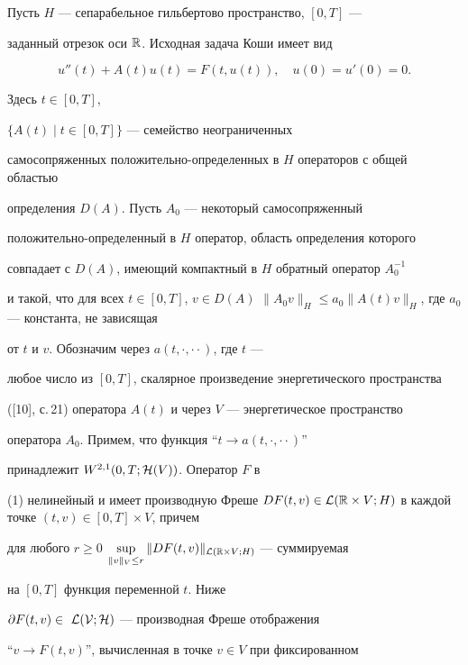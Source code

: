 Пусть $H$ --- сепарабельное гильбертово пространство, $[0,T]$ ---


заданный отрезок оси ${\Bbb R}$.  Исходная задача Коши имеет вид


\begin{equation}


u''(t)


+ A(t)u(t) = F(t,u(t)),\quad u(0)=u'(0)=0.


\end{equation}


Здесь $t\in[0,T]$,


$\{A(t)\mid t\in[0,T]\}$ --- семейство неограниченных


самосопряженных положительно-определенных в $H$ операторов с общей областью


определения $D(A)$.  Пусть $A_0$ --- некоторый самосопряженный


положительно-определенный в $H$ оператор, область определения которого


совпадает с $D(A)$, имеющий компактный в $H$ обратный оператор $A^{-1}_{0}$


и такой, что для всех $t\in[0,T]$, $v\in D(A)$\; $\|A_{0}v\|_{H}


\leq a_0 \|A(t)v \|_{H}$, где $a_0$ --- константа, не зависящая


от $t$ и $v$.  Обозначим через $a(t,\cdot,\cdot\cdot)$, где $t$ ---


любое число из $[0,T]$, скалярное произведение энергетического пространства


([10], с.\,21) оператора $A(t)$ и через $V$ --- энергетическое пространство


оператора $A_0$.  Примем, что функция ``$t\to a(t,\cdot,\cdot\cdot)$''


принадлежит $W^{2,1}(0,T;{\cal H}(V))$.  Оператор $F$ в


(1) нелинейный и имеет производную Фреше $DF(t,v)\in{\cal


L}({\Bbb R}\times V;H)$ в каждой точке $(t,v) \in[0,T]\times V$, причем


для любого $r\ge 0$\; $\sup\limits_{\|v\|_{V} \leq r} \|DF(t,v)


\|_{{\cal L}({\Bbb R}\times V;H)}$ --- суммируемая


на $[0,T]$ функция переменной $t$.  Ниже


$\partial F(t,v)\in\ \cal {L}(V;H)$ --- производная Фреше отображения


``$v\to F(t,v)$'', вычисленная в точке $v\in V$ при фиксированном



